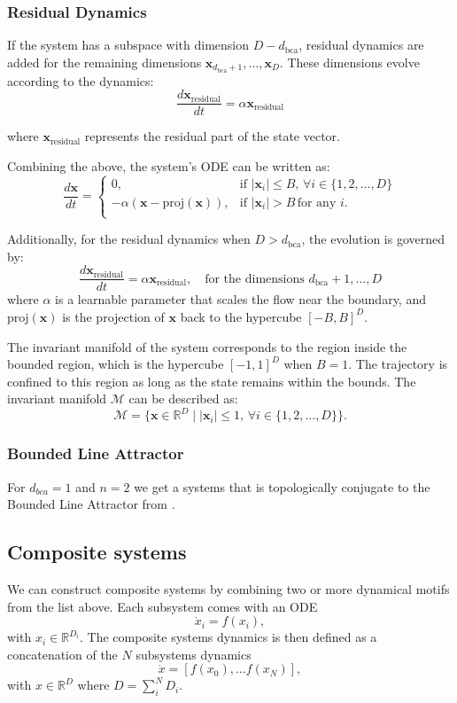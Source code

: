 \documentclass{article}
\theoremstyle{definition} \newtheorem{definition}{Definition}  \newtheorem{example}{Example}
\theoremstyle{remark} \newtheorem{remark}{Remark}
\newcounter{ct}
\newcommand{\field}[1]{\ensuremath{\mathbb{#1}}}
\newcommand{\reals}{\field{R}}
\begin{document}
\subsubsection*{Residual Dynamics}
If the system has a subspace with dimension \( D - d_{\text{bca}} \), residual dynamics are added for the remaining dimensions \( \mathbf{x}_{d_{\text{bca}}+1}, \dots, \mathbf{x}_D \). These dimensions evolve according to the dynamics:
\[
\frac{d \mathbf{x}_{\text{residual}}}{dt} = \alpha \mathbf{x}_{\text{residual}}
\]

where \( \mathbf{x}_{\text{residual}} \) represents the residual part of the state vector.

Combining the above, the system's ODE can be written as:
\[
\frac{d \mathbf{x}}{dt} =
\begin{cases}
0, & \text{if } |\mathbf{x}_i| \leq B, \, \forall i \in \{1, 2, \dots, D\} \\
-\alpha (\mathbf{x} - \text{proj}(\mathbf{x})), & \text{if } |\mathbf{x}_i| > B \, \text{for any } i. \\
\end{cases}
\]

Additionally, for the residual dynamics when \( D > d_{\text{bca}} \), the evolution is governed by:
\[
\frac{d \mathbf{x}_{\text{residual}}}{dt} = \alpha \mathbf{x}_{\text{residual}}, \quad \text{for the dimensions } d_{\text{bca}}+1, \dots, D
\]
where \( \alpha \) is a learnable parameter that scales the flow near the boundary, and \( \text{proj}(\mathbf{x}) \) is the projection of \( \mathbf{x} \) back to the hypercube \( [-B, B]^D \).


The invariant manifold of the system corresponds to the region inside the bounded region, which is the hypercube \( [-1, 1]^D \) when \( B = 1 \).
The trajectory is confined to this region as long as the state remains within the bounds.
The invariant manifold \( \mathcal{M} \) can be described as:
\[
\mathcal{M} = \{ \mathbf{x} \in \mathbb{R}^D \mid |\mathbf{x}_i| \leq 1, \, \forall i \in \{1, 2, \dots, D\} \}.
\]


\subsubsection{Bounded Line Attractor}
For $d_{bca}=1$ and $n=2$ we get a systems that is topologically conjugate to the Bounded Line Attractor from \citep{Sagodi2024a}.



\subsection{Composite systems}\label{sec:composite}
We can construct composite systems by combining two or more dynamical motifs from the list above.
Each subsystem comes with an ODE
\begin{equation}
\dot x_i = f(x_i),
\end{equation}
with $x_i\in \reals^{D_i}$.
The composite systems dynamics is then defined as a concatenation of the $N$ subsystems dynamics
\begin{equation}
\dot x = [f(x_0), \dots f(x_N)],
\end{equation}
with $x\in \reals^{D}$ where $D=\sum_i^N D_i$.
\end{document}
